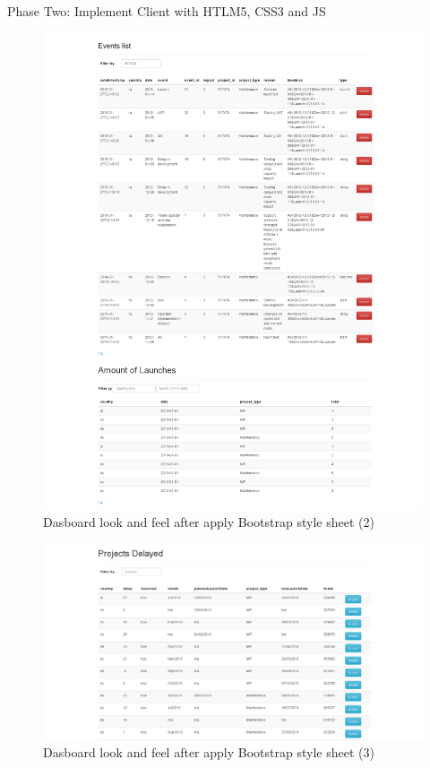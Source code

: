 \begin{part}{Phase Two: Implement Client with HTLM5, CSS3 and JS}
\begin{figure}[ht!]
	\centering
   	\includegraphics[width=1\textwidth]{./resources/dashboard_after_bootstrap_2.png}
   	\caption{Dasboard look and feel after apply Bootstrap style sheet (2)}
   	\label{f_facelift_bootstrap_2}
\end{figure}

\begin{figure}[ht!]
	\centering
   	\includegraphics[width=1\textwidth]{./resources/dashboard_after_bootstrap_3.png}
   	\caption{Dasboard look and feel after apply Bootstrap style sheet (3)}
   	\label{f_facelift_bootstrap_3}
\end{figure}


\end{part}
